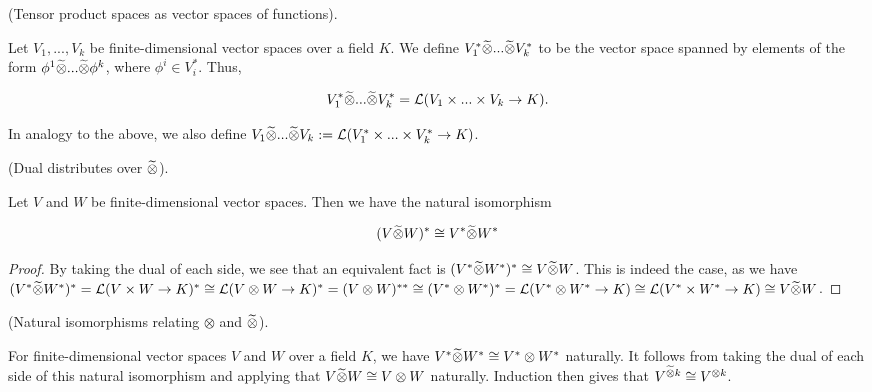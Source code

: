 \begin{defn}
    (Tensor product spaces as vector spaces of functions).
    
    Let $V_1, ..., V_k$ be finite-dimensional vector spaces over a field $K$. We define $V_1^* \widetilde{\otimes} ... \widetilde{\otimes} V_k^*$ to be the vector space spanned by elements of the form $\phi^1 \widetilde{\otimes} ... \widetilde{\otimes} \phi^k$, where $\phi^i \in V_i^*$. Thus, 
    
    \begin{align*}
        V_1^* \widetilde{\otimes} ... \widetilde{\otimes} V_k^* = \mathcal{L}(V_1 \times ... \times V_k \rightarrow K).
    \end{align*}
    
    In analogy to the above, we also define $V_1 \widetilde{\otimes} ... \widetilde{\otimes} V_k := \mathcal{L}(V_1^* \times ... \times V_k^* \rightarrow K)$.
\end{defn}

\begin{theorem}
    (Dual distributes over $\widetilde{\otimes}$).
    
    Let $V$ and $W$ be finite-dimensional vector spaces. Then we have the natural isomorphism
    
    \begin{align*}
        (V \widetilde{\otimes} W)^* \cong
        V^* \widetilde{\otimes} W^*
    \end{align*}
\end{theorem}

\begin{proof}
    By taking the dual of each side, we see that an equivalent fact is $(V^* \widetilde{\otimes} W^*)^* \cong V \widetilde{\otimes} W$. This is indeed the case, as we have $(V^* \widetilde{\otimes} W^*)^* = \mathcal{L}(V \times W \rightarrow K)^* \cong \mathcal{L}(V \otimes W \rightarrow K)^* = (V \otimes W)^{**} \cong (V^* \otimes W^*)^* = \mathcal{L}(V^* \otimes W^* \rightarrow K) \cong \mathcal{L}(V^* \times W^* \rightarrow K) \cong V \widetilde{\otimes} W$.
\end{proof}

\begin{theorem}
    (Natural isomorphisms relating $\otimes$ and $\widetilde{\otimes}$).
     
    For finite-dimensional vector spaces $V$ and $W$ over a field $K$, we have $V^* \widetilde{\otimes} W^* \cong V^* \otimes W^*$ naturally. It follows from taking the dual of each side of this natural isomorphism and applying that $V \widetilde{\otimes} W \cong V \otimes W$ naturally. Induction then gives that $V^{\widetilde{\otimes} k} \cong V^{\otimes k}$.
\end{theorem}

